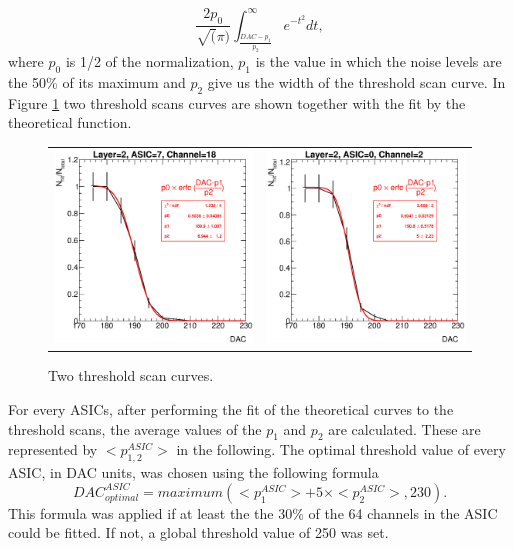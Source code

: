 \documentclass[a4paper,11pt]{article}
\begin{document}
\begin{equation}
\frac{2p_{0}}{\sqrt(\pi)} \int_{\frac{DAC-p_{1}}{p_{2}}}^{\infty} e^{-t^{2}} dt,
\label{eq_S-curve}
\end{equation}
where $p_{0}$ is 1/2 of the normalization, $p_{1}$ is the value in which the noise levels are 
the 50\% of its maximum and $p_{2}$ give us the width of the threshold scan curve. 
In Figure \ref{scurve_channels} 
two threshold scans curves are shown together with the fit by
the theoretical function.

\begin{figure}[!ht]
  \centering
  \begin{tabular}{ll}
  \includegraphics[width=2.8in]{../figs/commissioning/scurve_chn18_asic7_layer2.eps} & \includegraphics[width=2.8in]{../figs/commissioning/scurve_chn2_asic0_layer2.eps}
  \end{tabular}
\caption{Two threshold scan curves.}
\label{scurve_channels}
\end{figure}


For every ASICs, after performing the fit of the theoretical curves
to the threshold scans, the average values of the   $p_{1}$ and $p_{2}$ are calculated.
These are represented by $<p_{1,2}^{ASIC}>$ in the following.
The optimal threshold value of every ASIC, in DAC units, was chosen 
using the following formula
\begin{equation}
DAC_{optimal}^{ASIC} =maximum(<p_{1}^{ASIC}> + 5 \times <p_{2}^{ASIC}>,230).
\end{equation}
This formula was applied 
if at least the the 30\% of the 64 channels in the ASIC could be fitted.
If not, a global threshold value of 250 was set.
\end{document}

